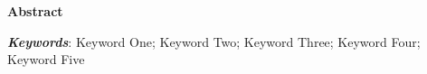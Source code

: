 \newpage
\thispagestyle{empty}
\begin{center}
	\vspace*{-0.4cm}
	{\LARGE {\textbf{Abstract}}}
\end{center}
\setlength{\baselineskip}{8pt} \setlength{\parskip}{2pt}
\begin{spacing}{1.2}
\lipsum[1-4]


{\emph{\textbf{Keywords}}}: Keyword One; Keyword Two; Keyword Three; Keyword Four; Keyword Five

\end{spacing} 